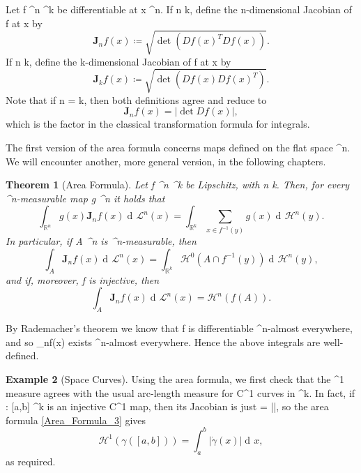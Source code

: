 \documentclass[a4paper, 11pt]{article}
\theoremstyle{plain}
\newtheorem{theorem}{Theorem}[section]
\theoremstyle{definition}
\newtheorem{example}[theorem]{Example}
\theoremstyle{remark}
\DeclareMathOperator{\diff}{d \!}
\numberwithin{equation}{subsection}
\def\({}
\def\){}
\begin{document}
Let \(f \vcentcolon {}^n \rightarrow {}^k\) be differentiable at \(x \in {}^n\). If \(n \leqslant k\), define the \(n\)-dimensional Jacobian of \(f\) at \(x\) by
\begin{equation}
\mathbf{J}_{n}f(x) \coloneq \sqrt{\det(Df(x)^{T}Df(x))}.
\end{equation}
If \(n \geqslant k\), define the \(k\)-dimensional Jacobian of \(f\) at \(x\) by
\begin{equation}
\mathbf{J}_{k}f(x) \coloneq \sqrt{\det(Df(x)Df(x)^{T})}.
\end{equation}
Note that if \(n = k\), then both definitions agree and reduce to
\begin{equation}
\mathbf{J}_{n}f(x) = \vert\det Df(x)\vert,
\end{equation}
which is the factor in the classical transformation formula for integrals.

The first version of the area formula concerns maps defined on the flat space \(^n\). We will encounter another, more general version, in the following chapters.

\begin{theorem}[Area Formula]
Let \(f \vcentcolon {}^n \rightarrow {}^k\) be Lipschitz, with \(n \leqslant k\). Then, for every \(^n\)-measurable map \(g \vcentcolon {}^n \rightarrow {}\) it holds that
\begin{equation}
\int_{\mathbb{R}^{n}}g(x)\mathbf{J}_{n}f(x)\diff\mathcal{L}^{n}(x) = \int_{\mathbb{R}^{k}}\sum_{x \in f^{-1}(y)}g(x)\diff \mathcal{H}^{n}(y).
\end{equation}
In particular, if \(A \subset {}^{n}\) is \(^{n}\)-measurable, then
\begin{equation}
\int_{A}\mathbf{J}_{n}f(x)\diff\mathcal{L}^{n}(x) = \int_{\mathbb{R}^{k}}\mathcal{H}^{0}(A \cap f^{-1}(y))\diff \mathcal{H}^{n}(y),
\end{equation}
and if, moreover, \(f\) is injective, then
\begin{equation}
\label{Area_Formula_3}
\int_{A}\mathbf{J}_{n}f(x)\diff\mathcal{L}^{n}(x) = \mathcal{H}^{n}(f(A)).
\end{equation}
\end{theorem}
By Rademacher's theorem we know that \(f\) is differentiable \(^{n}\)-almost everywhere, and so \(_{n}f(x)\) exists \(^{n}\)-almost everywhere. Hence the above integrals are well-defined.

\begin{example}[Space Curves]
Using the area formula, we first check that the \(^1\) measure agrees with the usual arc-length measure for \(C^1\) curves in \(^{k}\). In fact, if \(\gamma : [a,b] \rightarrow {}^{k}\) is an injective \(C^1\) map, then its Jacobian is just \( = |\dot{\gamma}|\), so the area formula \eqref{Area_Formula_3} gives
\begin{equation}
\mathcal{H}^1(\gamma([a,b])) = \int_{a}^{b}|\dot{\gamma}(x)|\diff x,
\end{equation}
as required.
\end{example}
\end{document}
